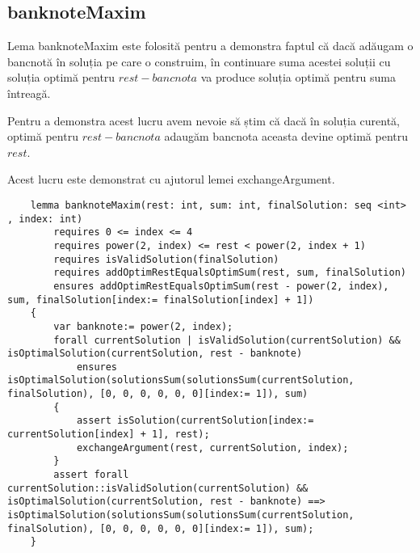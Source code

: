     \subsection{banknoteMaxim}
    Lema banknoteMaxim este folosită pentru a demonstra faptul că dacă adăugam o bancnotă în soluția pe care o 
    construim, în continuare suma acestei soluții cu soluția optimă pentru $ rest - bancnota$ va produce soluția 
    optimă pentru suma întreagă.\par
    Pentru a demonstra acest lucru avem nevoie să știm că dacă în soluția curentă, optimă pentru $ rest - bancnota$  
    adaugăm bancnota aceasta devine optimă pentru $rest$.\par
    Acest lucru este demonstrat cu ajutorul lemei exchangeArgument.
    \begin{lstlisting}
    lemma banknoteMaxim(rest: int, sum: int, finalSolution: seq <int> , index: int)
        requires 0 <= index <= 4
        requires power(2, index) <= rest < power(2, index + 1)
        requires isValidSolution(finalSolution)
        requires addOptimRestEqualsOptimSum(rest, sum, finalSolution)
        ensures addOptimRestEqualsOptimSum(rest - power(2, index), sum, finalSolution[index:= finalSolution[index] + 1]) 
    {
        var banknote:= power(2, index);
        forall currentSolution | isValidSolution(currentSolution) && isOptimalSolution(currentSolution, rest - banknote)
            ensures isOptimalSolution(solutionsSum(solutionsSum(currentSolution, finalSolution), [0, 0, 0, 0, 0, 0][index:= 1]), sum) 
        {
            assert isSolution(currentSolution[index:= currentSolution[index] + 1], rest);
            exchangeArgument(rest, currentSolution, index);
        }
        assert forall currentSolution::isValidSolution(currentSolution) && isOptimalSolution(currentSolution, rest - banknote) ==> isOptimalSolution(solutionsSum(solutionsSum(currentSolution, finalSolution), [0, 0, 0, 0, 0, 0][index:= 1]), sum);
    }
    \end{lstlisting}

